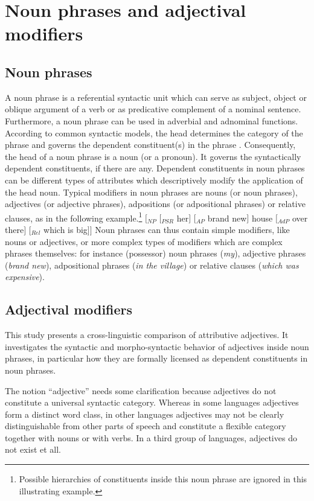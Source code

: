 
\chapter{Noun phrases and adjectival modifiers}

\section{Noun phrases}

A noun phrase is a referential syntactic unit which can serve as subject, object or oblique argument of a verb or as predicative complement of a nominal sentence. Furthermore, a noun phrase can be used in adverbial and adnominal functions. According to common syntactic models, the head determines the category of the phrase and governs the dependent constituent(s) in the phrase \citep[cf.~][57]{nichols1986}. Consequently, the head of a noun phrase is a noun (or a pronoun). It governs the syntactically dependent constituents, if there are any. Dependent constituents in noun phrases can be 
different types of attributes which descriptively modify the application of the head noun. Typical modifiers in noun phrases are nouns (or noun phrases), adjectives (or adjective phrases), adpositions (or adpositional phrases) or relative clauses, as in the following example.\footnote{Possible hierarchies of constituents inside this noun phrase are ignored in this illustrating example.}
\ea 
$[$$_{NP}$ $[$$_{PSR}$ her$]$ $[$$_{AP}$ brand new$]$ house $[$$_{AdP}$ over there$]$ $[$$_{Rel}$ which is big$]$$]$
\z
Noun phrases can thus contain simple modifiers, like nouns or adjectives, or more complex types of modifiers which are complex phrases themselves: for instance (possessor) noun phrases (\textit{my}), adjective phrases (\textit{brand new}), adpositional phrases (\textit{in the village}) or relative clauses (\textit{which was expensive}).

\section{Adjectival modifiers}

This study presents a cross-linguistic comparison of attributive adjectives. It investigates the syntactic and morpho-syntactic behavior of adjectives inside noun phrases, in particular how they are formally licensed as dependent constituents in noun phrases.

The notion “adjective” needs some clarification because adjectives do not constitute a universal syntactic category. Whereas in some languages adjectives form a distinct word class, in other languages adjectives may not be clearly distinguishable from other parts of speech and constitute a flexible category together with nouns or with verbs. In a third group of languages, adjectives do not exist et all.

